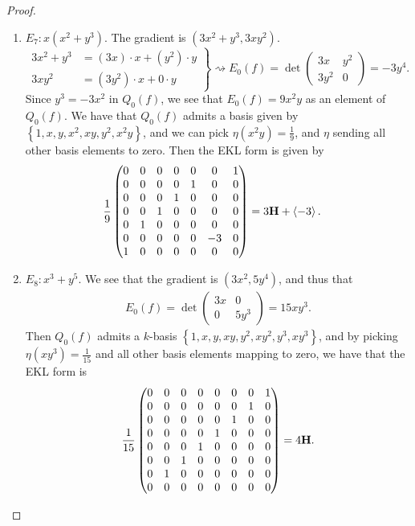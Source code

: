 \documentclass[english]{article}
\begin{document}
\begin{proof}
\begin{enumerate}
    \item $E_7: x(x^2 + y^3)$. The gradient is $(3x^2 + y^3, 3xy^2)$. 
    \[ \left.\begin{aligned}
       3x^2 + y^3 &= (3x)\cdot x + (y^2)\cdot y \\
       3xy^2 &= (3y^2) \cdot x + 0\cdot y
    \end{aligned} \right\}  \rightsquigarrow E_0(f) = \det \begin{pmatrix} 3x & y^2 \\ 3y^2 & 0 \end{pmatrix} = -3y^4.
    \]
    Since $y^3 = -3x^2$ in $Q_0(f)$, we see that $E_0(f) = 9x^2y$ as an element of $Q_0(f)$. We have that $Q_0(f)$ admits a basis given by $\left\{ 1,x,y,x^2,xy,y^2, x^2y \right\}$, and we can pick $\eta(x^2 y) = \frac{1}{9}$, and $\eta$ sending all other basis elements to zero. Then the EKL form is given by
    \begin{align*}
        \frac{1}{9}\begin{pmatrix} 0 & 0 & 0 & 0 & 0 & 0 & 1 \\
        0 & 0 & 0 & 0 & 1 & 0 & 0 \\
        0 & 0 & 0 & 1 & 0 & 0  & 0 \\
        0 & 0 & 1 & 0 & 0 & 0  & 0 \\
        0 & 1 & 0 & 0 & 0 & 0  & 0 \\
        0 & 0 & 0 & 0 & 0 & -3  & 0 \\
        1 & 0 & 0 & 0 & 0 & 0 & 0\end{pmatrix} &= 3\textbf{H} + \left\langle -3 \right\rangle.
    \end{align*}
    
    \item $E_8: x^3 + y^5$. We see that the gradient is $(3x^2, 5y^4)$, and thus that
    \begin{align*}
        E_0(f) = \det \begin{pmatrix} 3x & 0 \\ 0 & 5y^3\end{pmatrix} = 15xy^3.
    \end{align*}
    Then $Q_0(f)$ admits a $k$-basis $\left\{ 1,x,y,xy,y^2, xy^2, y^3, xy^3 \right\}$, and by picking $\eta(xy^3) = \frac{1}{15}$ and all other basis elements mapping to zero, we have that the EKL form is
    \begin{align*}
        \frac{1}{15} \begin{pmatrix} 0 & 0 & 0 & 0 & 0 & 0 & 0 & 1 \\
        0 & 0 &0 & 0 & 0 & 0 & 1 & 0 \\
        0 & 0 & 0 & 0 & 0 & 1 & 0  & 0 \\
        0 & 0 & 0 & 0 & 1 & 0 & 0  & 0 \\
        0 & 0 & 0 & 1 & 0 & 0 & 0  & 0 \\
        0 & 0 & 1 & 0 & 0 & 0 & 0  & 0 \\
        0 & 1 & 0 & 0 & 0 & 0 & 0  & 0 \\
        0 & 0 & 0 & 0 & 0 & 0 & 0  & 0  \end{pmatrix} = 4\textbf{H}.
    \end{align*}
    

\end{enumerate}
\end{proof}
\end{document}
